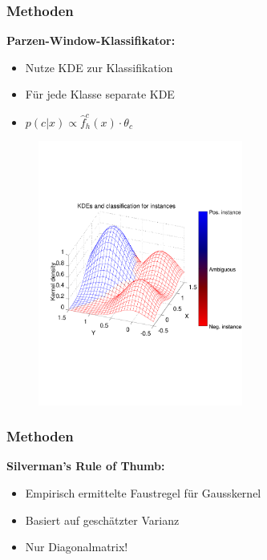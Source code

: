 \begin{frame}
	\frametitle{Methoden}
	
	\textbf{Parzen-Window-Klassifikator:}
	\begin{itemize}
		\item Nutze KDE zur Klassifikation
		\item F\"ur jede Klasse separate KDE
		\item $p(c | x) \propto \hat{f}_h^c(x) \cdot \theta_c$
	\end{itemize}
		
	\begin{figure}[p]
		\centering
		\includegraphics[trim = 0cm 6cm 0cm 5cm, clip = true, width = 0.6\textwidth]{figures/KDE3inst.pdf}
		\caption{}
		\label{fig:parzenwindow}
	\end{figure}
\end{frame}

\begin{frame}
	\frametitle{Methoden}
	
	\textbf{Silverman's Rule of Thumb:}
	\begin{itemize}
		\item Empirisch ermittelte Faustregel f\"ur Gausskernel
		\item Basiert auf geschätzter Varianz
		\item Nur Diagonalmatrix!
	\end{itemize}
	
\end{frame}

